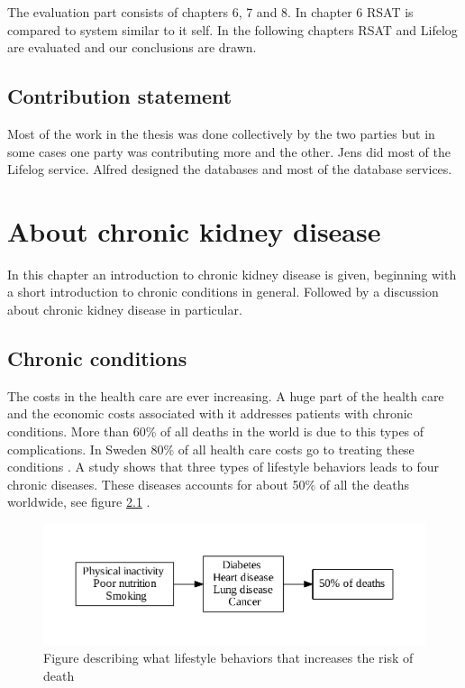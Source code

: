\documentclass{cslthse-msc}
\begin{document}
The evaluation part consists of chapters 6, 7 and 8. In chapter 6 RSAT is compared to system similar to it self. In the following chapters RSAT and Lifelog are evaluated and our conclusions are drawn. 


\section{Contribution statement}

Most of the work in the thesis was done collectively by the two parties but in some cases one party was contributing more and the other. Jens did most of the Lifelog service. Alfred designed the databases and most of the database services.    



\chapter{About chronic kidney disease}



In this chapter an introduction to chronic kidney disease is given, beginning with a short introduction to chronic conditions in general. Followed by a discussion about chronic kidney disease in particular.
  
\section{Chronic conditions}
\label{sec:chronic}

The costs in the health care are ever increasing. A huge part of the health care and the economic costs associated with it addresses patients with chronic conditions. More than 60\% of all deaths in the world is due to this types of complications. In Sweden 80\% of all health care costs go to treating these conditions \cite{SmartCare}. A study shows that three types of lifestyle behaviors  leads to four chronic diseases. These diseases accounts for about 50\% of all the deaths worldwide, see figure \ref{fig:chronic-fig} \cite{callaway2015quantified}.

\begin{figure}[!hbt]
\centering
\includegraphics[scale=0.8]{chronic-fig.pdf} 
\caption{Figure  describing what lifestyle behaviors that increases the risk of death}\label{fig:chronic-fig}
\end{figure}
\end{document}

